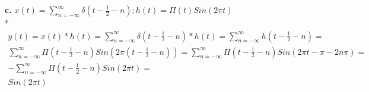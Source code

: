\documentclass[10pt, letterpaper]{article}
\begin{document}
\textbf{c.}
$x(t) = \sum_{n = -\infty}^{\infty} \delta(t - \frac{1}{2} - n) ; h(t) = \Pi(t)Sin(2\pi t)$\\*
\begin{align*}
	y(t) = x(t) * h(t) = \sum_{n = -\infty}^{\infty} \delta(t - \frac{1}{2} - n) * h(t)	= 
	\sum_{n = -\infty}^{\infty}h(t - \frac{1}{2} - n) = \\
	\sum_{n = -\infty}^{\infty} \Pi(t - \frac{1}{2} - n)Sin(2\pi (t - \frac{1}{2} - n)) = 
	\sum_{n = -\infty}^{\infty} \Pi(t - \frac{1}{2} - n)Sin(2\pi t - \pi - 2 n \pi ) = \\
	-\sum_{n = -\infty}^{\infty} \Pi(t - \frac{1}{2} - n)Sin(2\pi t) = \\
	\boxed{Sin(2\pi t)}
\end{align*}
\end{document}
